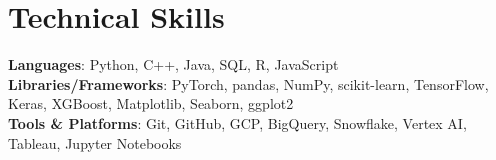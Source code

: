 \documentclass[letterpaper,11pt]{article}
\begin{document}
\section{Technical Skills}
 \begin{itemize}[leftmargin=0in, label={}]
    \small{\item{
     \textbf{Languages}{: Python, C++, Java, SQL, R, JavaScript} \\
     \textbf{Libraries/Frameworks}{: PyTorch, pandas, NumPy, scikit-learn, TensorFlow, Keras, XGBoost, Matplotlib, Seaborn, ggplot2} \\
     \textbf{Tools \& Platforms}{: Git, GitHub, GCP, BigQuery, Snowflake, Vertex AI, Tableau, Jupyter Notebooks}
    }}
 \end{itemize}
\end{document}
